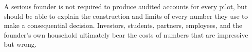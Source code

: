 A serious founder is not required to produce audited accounts for every pilot, but should be able to explain the construction and limits of every number they use to make a consequential decision. Investors, students, partners, employees, and the founder's own household ultimately bear the costs of numbers that are impressive but wrong.
